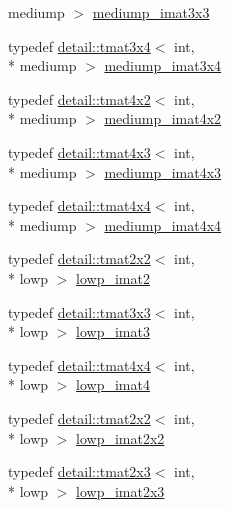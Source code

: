 \begin{DoxyCompactItemize}
mediump $>$ \hyperlink{group__gtc__matrix__integer_gac5ee8dc182055bb0a00a90c031d4a714}{mediump\-\_\-imat3x3}
\item 
typedef \hyperlink{structglm_1_1detail_1_1tmat3x4}{detail\-::tmat3x4}$<$ int, \\*
mediump $>$ \hyperlink{group__gtc__matrix__integer_gaaac79be4db34dde570c3331ffe728d55}{mediump\-\_\-imat3x4}
\item 
typedef \hyperlink{structglm_1_1detail_1_1tmat4x2}{detail\-::tmat4x2}$<$ int, \\*
mediump $>$ \hyperlink{group__gtc__matrix__integer_gacdae7d6ae4820756c62c2b5fd5c0370a}{mediump\-\_\-imat4x2}
\item 
typedef \hyperlink{structglm_1_1detail_1_1tmat4x3}{detail\-::tmat4x3}$<$ int, \\*
mediump $>$ \hyperlink{group__gtc__matrix__integer_ga5032ee978a55aa0db4842d5c3cbeade0}{mediump\-\_\-imat4x3}
\item 
typedef \hyperlink{structglm_1_1detail_1_1tmat4x4}{detail\-::tmat4x4}$<$ int, \\*
mediump $>$ \hyperlink{group__gtc__matrix__integer_gafa2df6be3aad055867b9bfea34e9c4a0}{mediump\-\_\-imat4x4}
\item 
typedef \hyperlink{structglm_1_1detail_1_1tmat2x2}{detail\-::tmat2x2}$<$ int, \\*
lowp $>$ \hyperlink{group__gtc__matrix__integer_gae0df4bc278c1a958a32af9ac82c47630}{lowp\-\_\-imat2}
\item 
typedef \hyperlink{structglm_1_1detail_1_1tmat3x3}{detail\-::tmat3x3}$<$ int, \\*
lowp $>$ \hyperlink{group__gtc__matrix__integer_ga149b90591e7275193c85cc08acbf0024}{lowp\-\_\-imat3}
\item 
typedef \hyperlink{structglm_1_1detail_1_1tmat4x4}{detail\-::tmat4x4}$<$ int, \\*
lowp $>$ \hyperlink{group__gtc__matrix__integer_ga7c687f14d923e05d5cf14aac41d10993}{lowp\-\_\-imat4}
\item 
typedef \hyperlink{structglm_1_1detail_1_1tmat2x2}{detail\-::tmat2x2}$<$ int, \\*
lowp $>$ \hyperlink{group__gtc__matrix__integer_ga05307630bc68a62132a82d1886a0b5e2}{lowp\-\_\-imat2x2}
\item 
typedef \hyperlink{structglm_1_1detail_1_1tmat2x3}{detail\-::tmat2x3}$<$ int, \\*
lowp $>$ \hyperlink{group__gtc__matrix__integer_ga5757953c508a6e05bf3573d6c099cf88}{lowp\-\_\-imat2x3}
\item 

\end{DoxyCompactItemize}
